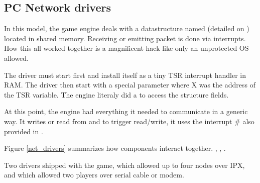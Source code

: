 




\subsection{PC Network drivers}
In this model, the game engine deals with a datastructure named  (detailed on \pageref{doomcom_t.c}) located in shared memory. Receiving or emitting packet is done via interrupts. How this all worked together is a magnificent hack like only an unprotected OS allowed.\\
\par
The driver must start first and install itself as a tiny TSR interrupt handler in RAM. The driver then start  with a special parameter  where X was the address of the TSR  variable. The engine literaly did a  to access the structure fields.\\
\par

\par
 At this point, the engine had everything it needed to communicate in a generic way. It writes or read from  and to trigger read/write, it uses the interrupt \# also provided in .\\
\par
{}
\par
Figure \ref{net_drivers} summarizes how components interact together. , , .\\
\par
Two drivers shipped with the game,  which allowed up to four nodes over IPX, and  which allowed two players over serial cable or modem.\\
\pagebreak






